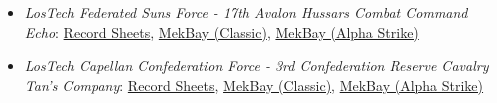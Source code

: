 \begin{itemize}
\item \emph{LosTech Federated Suns Force - 17th Avalon Hussars Combat Command Echo}: \href{https://raw.githubusercontent.com/Eudicods/outworlds-wastes/rules-pdf/federated-suns.pdf}{Record Sheets}, \href{https://mekbay.com/?units=Outworlds%20Wastes~BMBattleMaster_BLR1D:4:4,BMWolverine_WVR6R,BMEnforcer_ENF4R,BMJavelin_JVN10N,BMDervish_DV6M,BMBlackjack_BJ1,BMLocust_LCT1V,CVHunterLightSupportTank_LRM10,CVStrikerLightTank,CVPegasusScoutHoverTank_Unarmed,CVHeavyHoverAPC,CVHeavyHoverAPC,CVWarriorAttackHelicopter_H7,CVWarriorAttackHelicopter_H7,CIJumpPlatoon_SRM,CIFootPlatoonAntiMech_Rifle,CIFootPlatoonAntiMech_MG&name=17th%20Avalon%20Hussars%20Combat%20Command%20Echo&gs=cbt}{MekBay (Classic)},  \href{https://mekbay.com/?units=Outworlds%20Wastes~BMBattleMaster_BLR1D:4:4,BMWolverine_WVR6R,BMEnforcer_ENF4R,BMJavelin_JVN10N,BMDervish_DV6M,BMBlackjack_BJ1,BMLocust_LCT1V,CVHunterLightSupportTank_LRM10,CVStrikerLightTank,CVPegasusScoutHoverTank_Unarmed,CVHeavyHoverAPC,CVHeavyHoverAPC,CVWarriorAttackHelicopter_H7,CVWarriorAttackHelicopter_H7,CIJumpPlatoon_SRM,CIFootPlatoonAntiMech_Rifle,CIFootPlatoonAntiMech_MG&name=17th%20Avalon%20Hussars%20Combat%20Command%20Echo&gs=as}{MekBay (Alpha Strike)}

\item \emph{LosTech Capellan Confederation Force - 3rd Confederation Reserve Cavalry Tan's Company}: \href{https://raw.githubusercontent.com/Eudicods/outworlds-wastes/rules-pdf/capellan-confederation.pdf}{Record Sheets}, \href{https://mekbay.com/?units=Outworlds%20Wastes~BMCrusader_CRD3L:4:4,BMVindicator_VND1R,BMPhoenixHawk_PXH1,BMClint_CLNT23T,BMCicada_CDA2A,CVCondorHeavyHoverTank_Liao:3:4,CVCondorHeavyHoverTank_Liao:3:4,CVVedetteMediumTank_Liao,CVVedetteMediumTank_Liao,CVHetzerWheeledAssaultGun:4:4,CVHetzerWheeledAssaultGun:4:4,CVHeavyWheeledAPC,CVHeavyWheeledAPC,CIFootPlatoonAntiMech_Rifle,CIFootPlatoonAntiMech_Rifle,CIMotorizedPlatoon_MG,CIMotorizedPlatoon_SRM&name=3rd%20Confederation%20Reserve%20Cavalry%20Tan's%20Company&gs=cbt}{MekBay (Classic)}, \href{https://mekbay.com/?units=Outworlds%20Wastes~BMCrusader_CRD3L:4:4,BMVindicator_VND1R,BMPhoenixHawk_PXH1,BMClint_CLNT23T,BMCicada_CDA2A,CVCondorHeavyHoverTank_Liao:3:4,CVCondorHeavyHoverTank_Liao:3:4,CVVedetteMediumTank_Liao,CVVedetteMediumTank_Liao,CVHetzerWheeledAssaultGun:4:4,CVHetzerWheeledAssaultGun:4:4,CVHeavyWheeledAPC,CVHeavyWheeledAPC,CIFootPlatoonAntiMech_Rifle,CIFootPlatoonAntiMech_Rifle,CIMotorizedPlatoon_MG,CIMotorizedPlatoon_SRM&name=3rd%20Confederation%20Reserve%20Cavalry%20Tan's%20Company&gs=as}{MekBay (Alpha Strike)}


\end{itemize}

